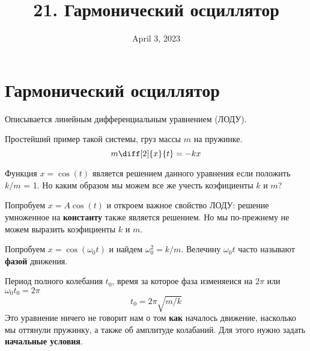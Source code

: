 \documentclass[12pt]{article}
\date{April 3, 2023}
\title{21. Гармонический осциллятор}
\begin{document}
\maketitle

\section{Гармонический осциллятор}

Описывается линейным дифференциальным уравнением (ЛОДУ).

Простейший пример такой системы, груз массы $m$ на пружинке.
\[
m\diff[2]{x}{t}=-kx
\]

Функция $x=\cos(t)$ является решением данного уравнения если положить $k/m$ = 1.
Но каким образом мы можем все же учесть коэфициенты $k$ и $m$?

Попробуем $x=A\cos(t)$ и откроем важное свойство ЛОДУ: решение умноженное на \textbf{константу} также является решением. Но мы по-прежнему не можем выразить коэфициенты $k$ и $m$.

Попробуем $x=\cos(\omega_0 t)$ и найдем $\omega_0^2=k/m$. Велечину $\omega_0 t$ часто называют \textbf{фазой} движения.

Период полного колебания $t_0$, время за которое фаза изменяеися на $2\pi$ или $\omega_0t_0=2\pi$
\[
t_0=2\pi\sqrt{m/k}
\]
Это уравнение ничего не говорит нам о том \textbf{как} началось движение, насколько мы оттянули пружинку, а также об амплитуде колабаний. Для этого нужно задать \textbf{начальные условия}.
\end{document}
